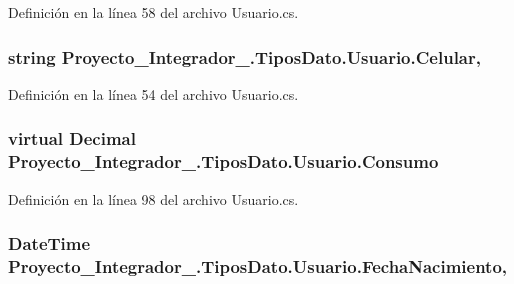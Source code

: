 Definición en la línea 58 del archivo Usuario.\-cs.

\hypertarget{class_proyecto___integrador__3_1_1_tipos_dato_1_1_usuario_aaf69133c2acd8387493608e39b5e4a2e}{
\subsubsection[{Celular}]{\setlength{\rightskip}{0pt plus 5cm}string Proyecto\-\_\-\-Integrador\-\_.\-Tipos\-Dato.\-Usuario.\-Celular\hspace{0.3cm}{\ttfamily [get]}, {\ttfamily [set]}}}\label{class_proyecto___integrador__3_1_1_tipos_dato_1_1_usuario_aaf69133c2acd8387493608e39b5e4a2e}


Definición en la línea 54 del archivo Usuario.\-cs.

\hypertarget{class_proyecto___integrador__3_1_1_tipos_dato_1_1_usuario_a17dc01f570b4c27936b81d486fc4a8bb}{
\subsubsection[{Consumo}]{\setlength{\rightskip}{0pt plus 5cm}virtual Decimal Proyecto\-\_\-\-Integrador\-\_.\-Tipos\-Dato.\-Usuario.\-Consumo\hspace{0.3cm}{\ttfamily [get]}}}\label{class_proyecto___integrador__3_1_1_tipos_dato_1_1_usuario_a17dc01f570b4c27936b81d486fc4a8bb}


Definición en la línea 98 del archivo Usuario.\-cs.

\hypertarget{class_proyecto___integrador__3_1_1_tipos_dato_1_1_usuario_acb7c4051a5323df336c32d932b5e83bb}{
\subsubsection[{Fecha\-Nacimiento}]{\setlength{\rightskip}{0pt plus 5cm}Date\-Time Proyecto\-\_\-\-Integrador\-\_.\-Tipos\-Dato.\-Usuario.\-Fecha\-Nacimiento\hspace{0.3cm}{\ttfamily [get]}, {\ttfamily [set]}}}\label{class_proyecto___integrador__3_1_1_tipos_dato_1_1_usuario_acb7c4051a5323df336c32d932b5e83bb}


